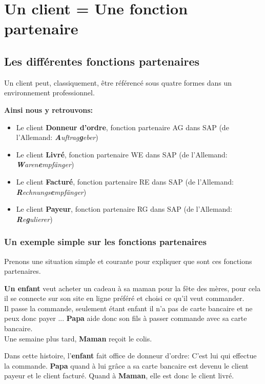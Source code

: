 \section{Un client = Une fonction partenaire}

\subsection{Les différentes fonctions partenaires}

Un client peut, classiquement, être référencé sous quatre formes dans un environnement professionnel.

\textbf{Ainsi nous y retrouvons:}

\begin{itemize}\itemsep7pt
	\item Le client \textbf{Donneur d'ordre}, fonction partenaire AG dans SAP (de l'Allemand: \textit{\textbf{A}uftrag\textbf{g}eber})
	\item Le client \textbf{Livré}, fonction partenaire WE dans SAP (de l'Allemand: \textit{\textbf{W}aren\textbf{e}mpfänger})
	\item Le client \textbf{Facturé}, fonction partenaire RE dans SAP (de l'Allemand: \textit{\textbf{R}echnungs\textbf{e}mpfänger})
	\item Le client \textbf{Payeur}, fonction partenaire RG dans SAP (de l'Allemand: \textit{\textbf{R}e\textbf{g}ulierer})
\end{itemize}

\subsubsection{Un exemple simple sur les fonctions partenaires}
Prenons une situation simple et courante pour expliquer que sont ces fonctions partenaires.

\textbf{Un enfant} veut acheter un cadeau à sa maman pour la fête des mères, pour cela il se connecte sur son site en ligne préféré et choisi ce qu'il veut commander.\\
Il passe la commande, seulement étant enfant il n'a pas de carte bancaire et ne peux donc payer ... \textbf{Papa} aide donc son fils à passer commande avec sa carte bancaire.\\
Une semaine plus tard, \textbf{Maman} reçoit le colis.

Dans cette histoire, l'\textbf{enfant} fait office de donneur d'ordre: C'est lui qui effectue la commande. \textbf{Papa} quand à lui grâce a sa carte bancaire est devenu le client payeur et le client facturé. Quand à \textbf{Maman}, elle est donc le client livré. 

